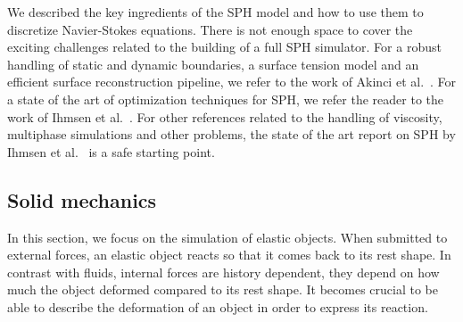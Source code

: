 We described the key ingredients of the SPH model and how to use them to discretize Navier-Stokes equations. 
There is not enough space to cover the exciting challenges related to the building of a full SPH simulator. 
For a robust handling of static and dynamic boundaries, a surface tension model and an efficient surface reconstruction pipeline, we refer to the work of Akinci et al.~\cite{Akinci2012b, Akinci2013, Akinci2012a}.  
For a state of the art of optimization techniques for SPH, we refer the reader to the work of Ihmsen et al.~\cite{Ihmsen2011:ParallelSPH}. 
For other references related to the handling of viscosity, multiphase simulations and other problems, the state of the art report on SPH by Ihmsen et al.~\cite{Ihmsen2014:STAR} is a safe starting point.

\subsection{Solid mechanics}
\label{subsec:solidMechanics}
In this section, we focus on the simulation of elastic objects. When submitted to external forces, an elastic object reacts so that it comes back to its rest shape. In contrast with fluids, internal forces are history dependent, they depend on how much the object deformed compared to its rest shape. It becomes crucial to be able to describe the deformation of an object in order to express its reaction. 

